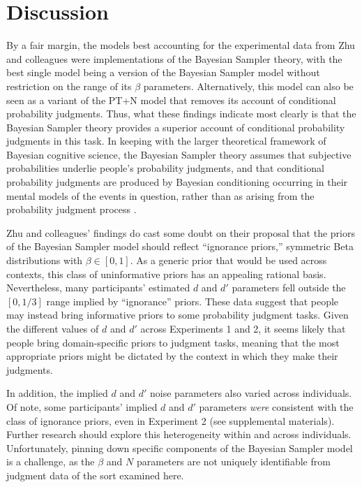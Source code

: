 \documentclass[
  english,
  man,floatsintext]{apa6}
\begin{document}
\hypertarget{discussion}{%
\section{Discussion}\label{discussion}}

By a fair margin, the models best accounting for the experimental data from Zhu and colleagues \autocite*{zhu.etal2020} were implementations of the Bayesian Sampler theory, with the best single model being a version of the Bayesian Sampler model without restriction on the range of its \(\beta\) parameters. Alternatively, this model can also be seen as a variant of the PT+N model that removes its account of conditional probability judgments. Thus, what these findings indicate most clearly is that the Bayesian Sampler theory provides a superior account of conditional probability judgments in this task. In keeping with the larger theoretical framework of Bayesian cognitive science, the Bayesian Sampler theory assumes that subjective probabilities underlie people's probability judgments, and that conditional probability judgments are produced by Bayesian conditioning occurring in their mental models of the events in question, rather than as arising from the probability judgment process \autocite{chater.etal2020,zhu.etal2020}.

Zhu and colleagues' findings do cast some doubt on their proposal that the priors of the Bayesian Sampler model should reflect ``ignorance priors,'' symmetric Beta distributions with \(\beta \in [0, 1]\). As a generic prior that would be used across contexts, this class of uninformative priors has an appealing rational basis. Nevertheless, many participants' estimated \(d\) and \(d'\) parameters fell outside the \([0, 1/3]\) range implied by ``ignorance'' priors. These data suggest that people may instead bring informative priors to some probability judgment tasks. Given the different values of \(d\) and \(d'\) across Experiments 1 and 2, it seems likely that people bring domain-specific priors to judgment tasks, meaning that the most appropriate priors might be dictated by the context in which they make their judgments.

In addition, the implied \(d\) and \(d'\) noise parameters also varied across individuals. Of note, some participants' implied \(d\) and \(d'\) parameters \emph{were} consistent with the class of ignorance priors, even in Experiment 2 (see supplemental materials). Further research should explore this heterogeneity within and across individuals. Unfortunately, pinning down specific components of the Bayesian Sampler model is a challenge, as the \(\beta\) and \(N\) parameters are not uniquely identifiable from judgment data of the sort examined here.
\end{document}
